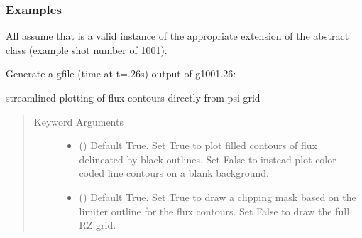 \documentclass[letterpaper,10pt,english]{sphinxmanual}
\begin{document}
\begin{fulllineitems}
\begin{fulllineitems}
\begin{quote}
\begin{description}
\end{description}\end{quote}
\subsubsection*{Examples}

All assume that  is a valid instance of the appropriate
extension of the  abstract class (example
shot number of 1001).

Generate a gfile (time at t=.26s) output of g1001.26:

\begin{sphinxVerbatim}[commandchars=\\\{\}]
\end{sphinxVerbatim}

\end{fulllineitems}


\begin{fulllineitems}
\label{\detokenize{eqtools:eqtools.eqdskreader.EqdskReader.plotFlux}}
streamlined plotting of flux contours directly from psi grid
\begin{quote}\begin{description}
\item[{Keyword Arguments}] \leavevmode\begin{itemize}
\item {} 
 () \textendash{} Default True.  Set True to plot filled contours of
flux delineated by black outlines.  Set False to instead plot
color-coded line contours on a blank background.

\item {} 
 () \textendash{} Default True.  Set True to draw a clipping mask
based on the limiter outline for the flux contours.  Set False
to draw the full RZ grid.

\end{itemize}

\end{description}\end{quote}

\end{fulllineitems}


\end{fulllineitems}
\end{document}
